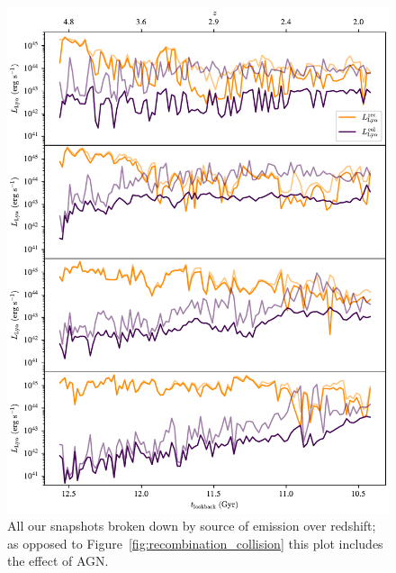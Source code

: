 \begin{figure}
    \centering
    \includegraphics[width=\textwidth,height=\textheight,keepaspectratio]{figures/agn_recombination_collision.pdf}
    \caption{
        All our snapshots broken down by source of emission over redshift; as opposed to Figure~\ref{fig:recombination_collision} this plot includes the effect of AGN.
    }
    \label{fig:agn_recombination_collision}
\end{figure}

